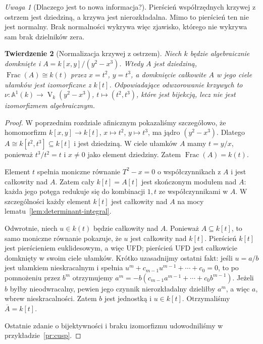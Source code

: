 \documentclass[11pt,a4paper,openany]{report}
\numberwithin{equation}{section}
\theoremstyle{plain}
\newtheorem{twierdzenie}{Twierdzenie}[section]
\theoremstyle{definition}
\theoremstyle{remark}
\newtheorem{uwaga}[twierdzenie]{Uwaga}
\newcommand{\A}{\mathbb A}
\newcommand{\V}{\operatorname V}
\newcommand{\Frac}{\operatorname{Frac}}
\begin{document}
\begin{uwaga}[Dlaczego jest to nowa informacja?]
Pierścień współrzędnych krzywej z ostrzem jest dziedziną,
a krzywa jest nierozkładalna. Mimo to pierścień ten
nie jest normalny. Brak normalności wykrywa więc
zjawisko, którego nie wykrywa sam brak dzielników zera.
\end{uwaga}

\begin{twierdzenie}[Normalizacja krzywej z ostrzem]
\label{tw:normalize-cusp}
Niech $k$ będzie algebraicznie domknięte i
$A=k[x,y]/(y^2-x^3)$. Wtedy $A$ jest dziedziną,
$\Frac(A)\cong k(t)$ przez $x=t^2$, $y=t^3$,
a domknięcie całkowite $A$ w jego ciele ułamków jest
izomorficzne z $k[t]$. Odpowiadające odwzorowanie
krzywych to $\nu:\A^1(k)\to\V_k(y^2-x^3)$,
$t\mapsto(t^2,t^3)$, które jest bijekcją, lecz nie jest
izomorfizmem algebraicznym.
\end{twierdzenie}
\begin{proof}
W poprzednim rozdziale afinicznym pokazaliśmy szczegółowo,
że homomorfizm $k[x,y]\to k[t]$,
$x\mapsto t^2$, $y\mapsto t^3$, ma jądro $(y^2-x^3)$.
Dlatego $A\cong k[t^2,t^3]\subseteq k[t]$ i jest dziedziną.
W ciele ułamków $A$ mamy $t=y/x$, ponieważ
$t^3/t^2=t$ i $x\ne0$ jako element dziedziny.
Zatem $\Frac(A)=k(t)$.

Element $t$ spełnia moniczne równanie $T^2-x=0$
o współczynnikach z $A$ i jest całkowity nad $A$.
Zatem cały $k[t]=A[t]$ jest skończonym modułem nad $A$:
każda jego potęga redukuje się do kombinacji
$1,t$ ze współczynnikami w $A$.
W szczególności każdy element $k[t]$ jest całkowity nad $A$
na mocy lematu~\ref{lem:determinant-integral}.

Odwrotnie, niech $u\in k(t)$ będzie całkowity nad $A$.
Ponieważ $A\subseteq k[t]$, to samo moniczne równanie
pokazuje, że $u$ jest całkowity nad $k[t]$.
Pierścień $k[t]$ jest pierścieniem euklidesowym, a więc
UFD; pierścień UFD jest całkowicie domknięty w swoim
ciele ułamków. Krótko uzasadnijmy ostatni fakt:
jeśli $u=a/b$ jest ułamkiem nieskracalnym i spełnia
$u^m+c_{m-1}u^{m-1}+\cdots+c_0=0$, to po pomnożeniu
przez $b^m$ otrzymujemy
$a^m=-b(c_{m-1}a^{m-1}+\cdots+c_0b^{m-1})$.
Jeżeli $b$ byłby nieodwracalny, pewien jego czynnik
nierozkładalny dzieliłby $a^m$, a więc $a$, wbrew
nieskracalności. Zatem $b$ jest jednostką i $u\in k[t]$.
Otrzymaliśmy $\overline A=k[t]$.

Ostatnie zdanie o bijektywności i braku izomorfizmu
udowodniliśmy w przykładzie~\ref{pr:cusp}.
\end{proof}
\end{document}
